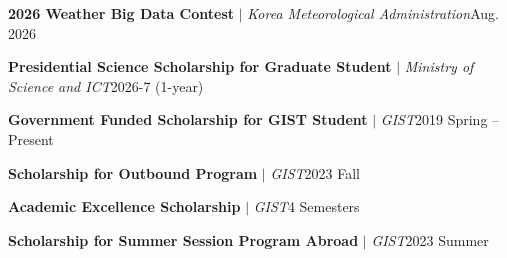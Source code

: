     \resumeSubHeadingListStart  
        \resumeProjectHeading
        {\textbf{2026 Weather Big Data Contest} $|$ \emph{Korea Meteorological Administration}}{Aug. 2026}
        \resumeItemListStart
        \resumeItemListEnd
        
    \resumeProjectHeading
        {\textbf{Presidential Science Scholarship for Graduate Student} $|$ \emph{Ministry of Science and ICT}}{2026-7 (1-year)}

    \resumeProjectHeading
          {\textbf{Government Funded Scholarship for GIST Student} $|$ \emph{GIST}}{2019 Spring -- Present}
          
    \resumeProjectHeading
          {\textbf{Scholarship for Outbound Program} $|$ \emph{GIST}}{2023 Fall}
          
    \resumeProjectHeading
          {\textbf{Academic Excellence Scholarship} $|$ \emph{GIST}}{4 Semesters}

    \resumeProjectHeading
          {\textbf{Scholarship for Summer Session Program Abroad} $|$ \emph{GIST}}{2023 Summer}

\resumeSubHeadingListEnd
